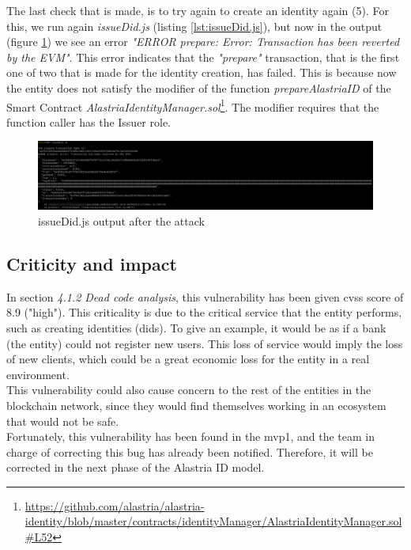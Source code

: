 \documentclass[a4paper, 12pt]{article} %
\begin{document}
        The last check that is made, is to try again to create an identity again (5). For this, we run again \textit{issueDid.js} (listing \ref{lst:issueDid.js}), but now in the output (figure \ref{fig:poc-5}) we see an error \textit{"ERROR prepare: Error: Transaction has been reverted by the EVM"}. This error indicates that the \textit{"prepare"} transaction, that is the first one of two that is made for the identity creation, has failed. This is because now the entity does not satisfy the modifier of the function \textit{prepareAlastriaID} of the Smart Contract \textit{AlastriaIdentityManager.sol}\footnote{\url{https://github.com/alastria/alastria-identity/blob/master/contracts/identityManager/AlastriaIdentityManager.sol\#L52}}. The modifier requires that the function caller has the Issuer role.
        \begin{figure}[h]
            \centering
            \includegraphics[width=1.0\textwidth]{poc/5.png}
            \caption{issueDid.js output after the attack}
            \label{fig:poc-5}
        \end{figure}
        
    \subsection{Criticity and impact}
        In section \textit{4.1.2 Dead code analysis}, this vulnerability has been given \acrshort{cvss} score of 8.9 ("high"). This criticality is due to the critical service that the entity performs, such as creating identities (\acrshort{did}s). To give an example, it would be as if a bank (the entity) could not register new users. This loss of service would imply the loss of new clients, which could be a great economic loss for the entity in a real environment.\\

        This vulnerability could also cause concern to the rest of the entities in the blockchain network, since they would find themselves working in an ecosystem that would not be safe.\\
        
        Fortunately, this vulnerability has been found in the \acrshort{mvp}1, and the team in charge of correcting this bug has already been notified. Therefore, it will be corrected in the next phase of the Alastria ID model.\\
        
\end{document}
